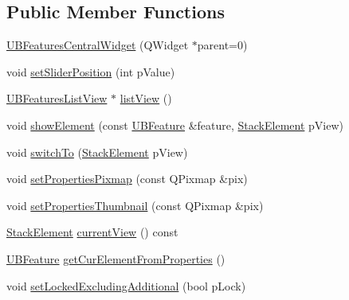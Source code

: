 \subsection*{Public Member Functions}
\begin{DoxyCompactItemize}
\item 
\hyperlink{class_u_b_features_central_widget_a0cd96fc53efb744812bf023b916264c1}{U\-B\-Features\-Central\-Widget} (Q\-Widget $\ast$parent=0)
\item 
void \hyperlink{class_u_b_features_central_widget_aeba1ba3f3e2568883ef04085ce599dc8}{set\-Slider\-Position} (int p\-Value)
\item 
\hyperlink{class_u_b_features_list_view}{U\-B\-Features\-List\-View} $\ast$ \hyperlink{class_u_b_features_central_widget_a4440885b4878fe1a1006af8dd757fe26}{list\-View} ()
\item 
void \hyperlink{class_u_b_features_central_widget_ae356e28bf5c15d16ee2f29b7ee7eac9f}{show\-Element} (const \hyperlink{class_u_b_feature}{U\-B\-Feature} \&feature, \hyperlink{class_u_b_features_central_widget_a1657c232f5793258dcab8a3fd4bc9437}{Stack\-Element} p\-View)
\item 
void \hyperlink{class_u_b_features_central_widget_a5fa1fde0a8cbeb5be2354b94cfe84bb5}{switch\-To} (\hyperlink{class_u_b_features_central_widget_a1657c232f5793258dcab8a3fd4bc9437}{Stack\-Element} p\-View)
\item 
void \hyperlink{class_u_b_features_central_widget_a0c4acf3318f579a2d0a37e3414c031ba}{set\-Properties\-Pixmap} (const Q\-Pixmap \&pix)
\item 
void \hyperlink{class_u_b_features_central_widget_af915403890dc5f08ea53dcfde152f4b3}{set\-Properties\-Thumbnail} (const Q\-Pixmap \&pix)
\item 
\hyperlink{class_u_b_features_central_widget_a1657c232f5793258dcab8a3fd4bc9437}{Stack\-Element} \hyperlink{class_u_b_features_central_widget_a98441d9e9ea2004d11dd01fbc613cdd3}{current\-View} () const 
\item 
\hyperlink{class_u_b_feature}{U\-B\-Feature} \hyperlink{class_u_b_features_central_widget_a41c0bee6840023b41885c9982ae280db}{get\-Cur\-Element\-From\-Properties} ()
\item 
void \hyperlink{class_u_b_features_central_widget_a865450a5edb13efde5a38ad10d66287a}{set\-Locked\-Excluding\-Additional} (bool p\-Lock)
\end{DoxyCompactItemize}
